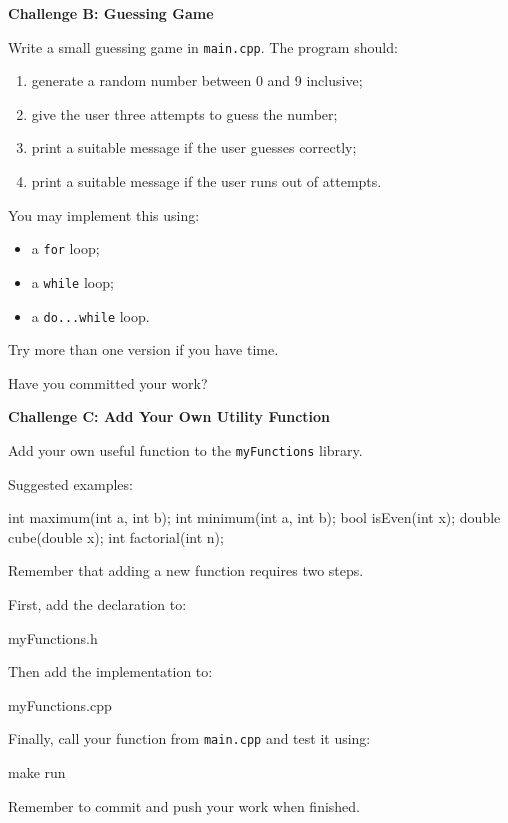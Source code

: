 \documentclass{csc2059practical}
\begin{document}
\Needspace{65mm}
\begin{challengebox}
\textbf{Challenge B: Guessing Game}

Write a small guessing game in \texttt{main.cpp}. The program should:

\begin{enumerate}
  \item generate a random number between 0 and 9 inclusive;
  \item give the user three attempts to guess the number;
  \item print a suitable message if the user guesses correctly;
  \item print a suitable message if the user runs out of attempts.
\end{enumerate}

You may implement this using:

\begin{itemize}
  \item a \texttt{for} loop;
  \item a \texttt{while} loop;
  \item a \texttt{do...while} loop.
\end{itemize}

Try more than one version if you have time.

Have you committed your work?
\end{challengebox}

\begin{challengebox}
\textbf{Challenge C: Add Your Own Utility Function}

Add your own useful function to the \texttt{myFunctions} library.

Suggested examples:

\begin{cppcode}
int maximum(int a, int b);
int minimum(int a, int b);
bool isEven(int x);
double cube(double x);
int factorial(int n);
\end{cppcode}

Remember that adding a new function requires two steps.

First, add the declaration to:

\begin{terminal}
myFunctions.h
\end{terminal}

Then add the implementation to:

\begin{terminal}
myFunctions.cpp
\end{terminal}

Finally, call your function from \texttt{main.cpp} and test it using:

\begin{bashcode}
make run
\end{bashcode}

Remember to commit and push your work when finished.
\end{challengebox}
\end{document}

